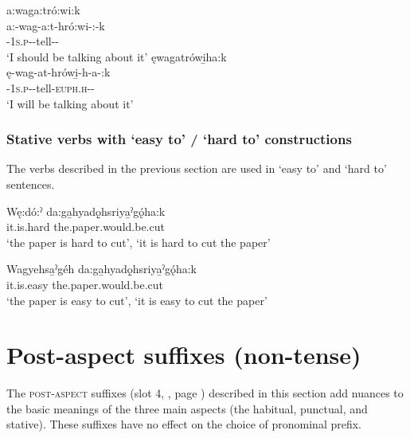 \ea\label{ex:statvarex38}
\ea a:waga:tró:wi:k\\\label{ex:statvarex38a}
\gll a:-wag-a:t-hró:wi-:-k\\
 {\indefinite}-\textsc{1s.p}-{\semireflexive}-tell-{\stative}-{\modalizer}\\
\glt `I should be talking about it'
\ex ęwagatrówi̱ha:k\\\label{ex:statvarex38b}
\gll ę-wag-at-hrówi̱-h-a-:k\\
 \fut-\textsc{1s.p}-{\semireflexive}-tell-\textsc{euph.h}-{\joinerA}-{\modalizer}\\
\glt `I will be talking about it'
\z
\z


\subsubsection{Stative verbs with ‘easy to’ / ‘hard to’ constructions} \label{Stative verbs with ‘easy to / hard to’ constructions}
The verbs described in the previous section are used in ‘easy to’  and ‘hard to’  sentences. 

\ea\label{ex:statvarex7} 
\gll Wę:dó:ˀ da:ga̱hyadǫ̱hsriya̱ˀgǫ́ha:k \\
it.is.hard the.paper.would.be.cut \\
\glt ‘the paper is hard to cut’, ‘it is hard to cut the paper’

\z

\ea\label{ex:statvarex8} 
\gll Wagyehsa̱ˀgéh da:ga̱hyadǫ̱hsriya̱ˀgǫ́ha:k \\
it.is.easy the.paper.would.be.cut \\
\glt ‘the paper is easy to cut’, ‘it is easy to cut the paper’
\z


\section{Post-aspect suffixes (non-tense)} \label{Post-aspect suffixes (non-tense)}
The \textsc{post-aspect} suffixes (slot 4, , page \pageref{figtab:1:verbsuffixorder}) described in this section add nuances to the basic meanings of the three main aspects (the habitual, punctual, and stative). These suffixes have no effect on the choice of pronominal prefix.


